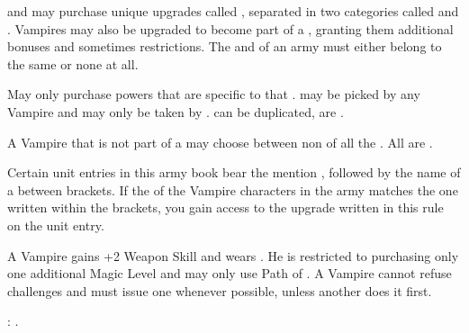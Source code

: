 
\closearmyspecialrules



\vampirelords{} and \vampireheroes{} may purchase unique upgrades called \bloodpowers{}, separated in two categories called \bloodlinepowers{} and \ancientbloodpowers{}. Vampires may also be upgraded to become part of a \bloodline{}, granting them additional bonuses and sometimes restrictions. The \vampirelords{} and \vampireheroes{} of an army must either belong to the same \bloodline{} or none at all.


May only purchase powers that are specific to that \bloodline{}. \bloodlinepowers{} may be picked by any Vampire and \ancientbloodpowers{} may only be taken by \vampirelords{}. \bloodlinepowers{} can be duplicated, \ancientbloodpowers{} are \oneofakind{}.


A Vampire that is not part of a \bloodline{} may choose between non \ancientbloodpowers{} of all the \bloodlines{}. All \bloodlinepowers{} are \oneofakind{}.


Certain unit entries in this army book bear the mention \bloodties{}, followed by the name of a \bloodline{} between brackets. If the \bloodline{} of the Vampire characters in the army matches the one written within the brackets, you gain access to the upgrade written in this rule on the unit entry.

\medskip

\separator


\noindent\parbox{\columnwidth}{
A \brotherhood{} Vampire gains +2 Weapon Skill and wears \platearmour{}. He is restricted to purchasing only one additional Magic Level and may only use Path of \necromancy{}. A \brotherhood{} Vampire cannot refuse challenges and must issue one whenever possible, unless another  does it first.

\bloodties{}: \vampireknights{}.
}


